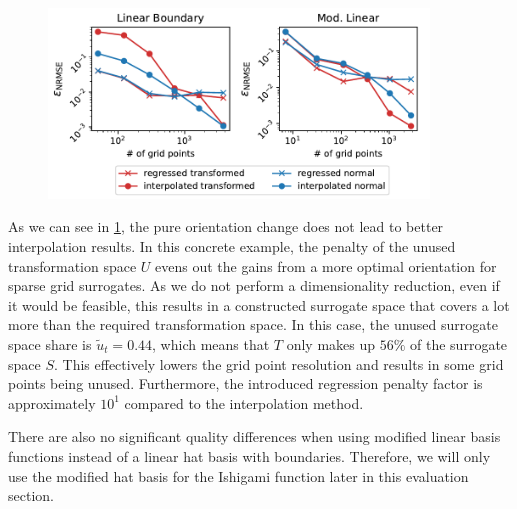\documentclass[
  a4paper,  %
  twoside,  %
  bibliography=totoc,
  headsepline,
  cleardoublepage=empty,
  parskip=half,
  draft=false
]{scrbook}
\begin{document}
\begin{mdframed}[style=style]
\vspace{-3mm}
\begin{figure}[H]
\centering
\includegraphics[width=0.9\textwidth]{graphics/ishigami_orientation}\vspace{-4mm}
\delimit
{}
\label{fig:ishigami_errors}
\end{figure}
\end{mdframed}
%
As we can see in \cref{fig:ishigami_errors}, the pure orientation change does not lead to better interpolation results.
In this concrete example, the penalty of the unused transformation space $U$ evens out the gains from a more optimal orientation for sparse grid surrogates.
As we do not perform a dimensionality reduction, even if it would be feasible, this results in a constructed surrogate space that covers a lot more than the required transformation space.
In this case, the unused surrogate space share is $\tilde{u}_t=0.44$, which means that $T$ only makes up $56\%$ of the surrogate space $S$.
This effectively lowers the grid point resolution and results in some grid points being unused.
Furthermore, the introduced regression penalty factor is approximately $10^1$ compared to the interpolation method.

There are also no significant quality differences when using modified linear basis functions instead of a linear hat basis with boundaries.
Therefore, we will only use the modified hat basis for the Ishigami function later in this evaluation section.
\end{document}
